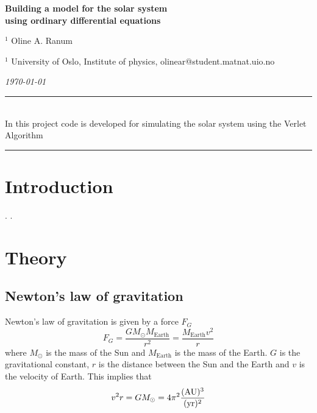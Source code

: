 \documentclass[%
reprint,nofootinbib,
amsmath,amssymb,
aps,
]{revtex4-1}
\newcommand{\HRule}{\rule{\textwidth}{0.5mm}}
\begin{document}
\onecolumngrid

\begin{center}
	\large\textbf{Building a model for the solar system \\ using ordinary differential equations}
\end{center}
\vspace{5mm}

\begin{center}
	\small{$^1$ Oline A. Ranum}\\
\end{center}

\begin{center}
	\small{$^1$ University of Oslo, Institute of physics, 
		olinear@student.matnat.uio.no}
\end{center}

\begin{center}
	\textit{\today}
\end{center}
\vspace{7mm}
\noindent 
\HRule \vspace{2mm}\\
	 In this project code is developed for simulating the solar system using the Verlet Algorithm 
\noindent 
\vspace{1.5mm}  \\
\HRule
\vspace{.2cm}


\section{Introduction} \noindent 
\vspace{3mm}
\twocolumngrid
\noindent 
\newpage. \newpage .\newpage 

\section{Theory} \noindent 
\subsection{Newton's law of gravitation}
Newton's law of gravitation is given by a force $F_G$
\begin{equation}\label{nwt}
	F_G = \frac{GM_{\odot}M_{\mathrm{Earth}}}{r^2} = \frac{M_{\mathrm{Earth}}v^2}{r}
\end{equation}
where $M_{\odot}$ is the mass of the Sun and $M_{\mathrm{Earth}}$ is the mass of the Earth. $G$ is the gravitational constant, $r$ is the distance between the Sun and the Earth and $v$ is the velocity of Earth. This implies that
\begin{equation}\label{motion1}
	v^2r = GM_{\odot} = 4\pi^2\dfrac{(\textnormal{AU})^3}{(\textnormal{yr})^2}
\end{equation}
\end{document}
